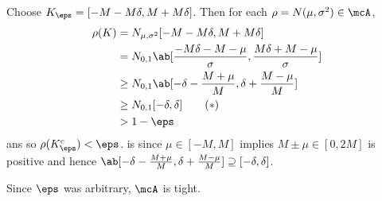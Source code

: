 \documentclass[12pt]{article}
\begin{document}
\begin{solution}
    Choose $K_\eps = [-M - M\delta, M + M\delta]$.
    Then for each $\rho = N(\mu, \sigma^2) \in \mcA$,
    \begin{align*}
        \rho(K) &= N_{\mu,\sigma^2}[-M-M\delta, M+M\delta] \\
        &= N_{0,1}\ab[\frac{-M\delta-M-\mu}{\sigma},
                      \frac{M\delta+M-\mu}{\sigma}] \\
        &\ge N_{0,1}\ab[-\delta - \frac{M+\mu}{M}, \delta + \frac{M-\mu}{M}] \\
        &\ge N_{0,1}[-\delta, \delta] \tag{$*$} \label{eq:bound} \\
        &> 1 - \eps
    \end{align*}
    ans so $\rho(K_\eps^c) < \eps$.
     is since $\mu \in [-M, M]$ implies
    $M\pm\mu \in [0, 2M]$ is positive and hence
    $\ab[-\delta - \frac{M+\mu}{M}, \delta + \frac{M-\mu}{M}]
    \supseteq [-\delta, \delta]$.

    Since $\eps$ was arbitrary, $\mcA$ is tight.
\end{solution}
\end{document}
